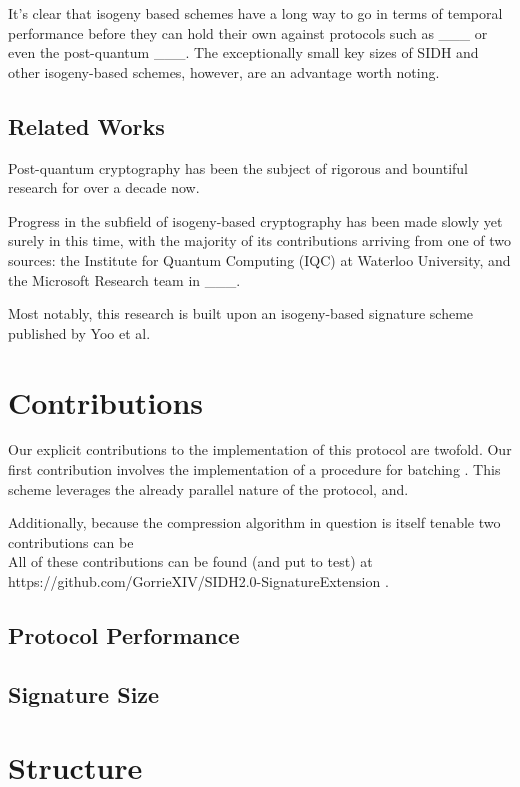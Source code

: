 It's clear that isogeny based schemes have a long way to go in terms of temporal performance before they can hold their own against protocols such as \_\_\_ or even the post-quantum \_\_\_. The exceptionally small key sizes of SIDH and other isogeny-based schemes, however, are an advantage worth noting. 

\subsection{Related Works}

Post-quantum cryptography has been the subject of rigorous and bountiful research for over a decade now. 

Progress in the subfield of isogeny-based cryptography has been made slowly yet surely in this time, with the majority of its contributions arriving from one of two sources: the Institute for Quantum Computing (IQC) at Waterloo University, and the Microsoft Research team in \_\_\_. 

Most notably, this research is built upon an isogeny-based signature scheme published by Yoo et al. 

\section{Contributions}

Our explicit contributions to the implementation of this protocol are twofold. Our first contribution involves the implementation of a procedure for batching . This scheme leverages the already parallel nature of the protocol, and.

Additionally, because the compression algorithm in question is itself tenable two contributions can be \\

All of these contributions can be found (and put to test) at https://github.com/GorrieXIV/SIDH2.0-SignatureExtension .

\subsection{Protocol Performance}

\subsection{Signature Size}


\section{Structure}



